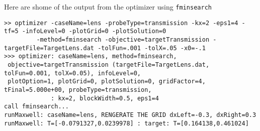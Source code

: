 \documentclass[11pt]{article}
\begin{document}
\medskip\noindent
Here are shome of the output from the optimizer using {\tt fminsearch}
{\scriptsize
\begin{verbatim}
>> optimizer -caseName=lens -probeType=transmission -kx=2 -eps1=4 -tf=5 -infoLevel=0 -plotGrid=0 -plotSolution=0 
         -method=fminsearch -objective=targetTransmission -targetFile=TargetLens.dat -tolFun=.001 -tolX=.05 -x0=-.1
>>> optimizer: caseName=lens, method=fminsearch, 
 objective=targetTransmission (targetFile=TargetLens.dat, tolFun=0.001, tolX=0.05), infoLevel=0, 
 plotOption=1, plotGrid=0, plotSolution=0, gridFactor=4, tFinal=5.000e+00, probeType=transmission, 
             : kx=2, blockWidth=0.5, eps1=4
call fminsearch...
runMaxwell: caseName=lens, RENGERATE THE GRID dxLeft=-0.3, dxRight=0.3
runMaxwell: T=[-0.0791327,0.0239978] : target: T=[0.164138,0.461024]
 

\end{verbatim}}
\end{document}
